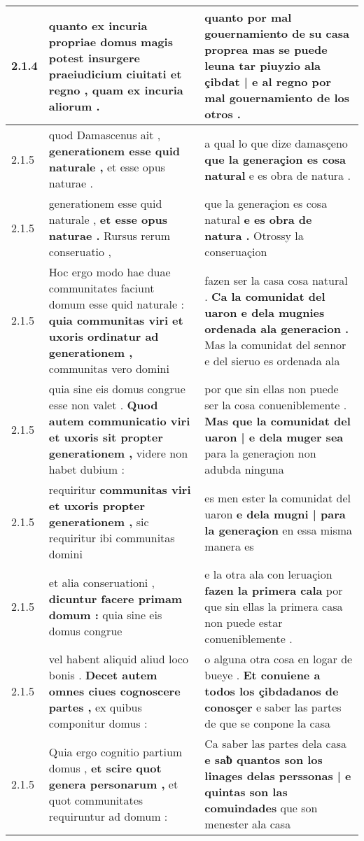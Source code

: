 \begin{tabular}{|p{1cm}|p{6.5cm}|p{6.5cm}|}
2.1.4 & quanto ex incuria propriae domus magis potest \textbf{ insurgere praeiudicium ciuitati et regno , } quam ex incuria aliorum . & quanto por mal gouernamiento de su casa proprea \textbf{ mas se puede leuna tar piuyzio ala çibdat | e al regno } por mal gouernamiento de los otros . \\\hline
2.1.5 & quod Damascenus ait , \textbf{ generationem esse quid naturale , } et esse opus naturae . & a qual lo que dize damasçeno \textbf{ que la generaçion es cosa natural } e es obra de natura . \\\hline
2.1.5 & generationem esse quid naturale , \textbf{ et esse opus naturae . } Rursus rerum conseruatio , & que la generaçion es cosa natural \textbf{ e es obra de natura . } Otrossy la conseruaçion \\\hline
2.1.5 & Hoc ergo modo hae duae communitates faciunt domum esse quid naturale : \textbf{ quia communitas viri et uxoris ordinatur ad generationem , } communitas vero domini & fazen ser la casa cosa natural . \textbf{ Ca la comunidat del uaron e dela mugnies ordenada ala generacion . } Mas la comunidat del sennor e del sieruo es ordenada ala \\\hline
2.1.5 & quia sine eis domus congrue esse non valet . \textbf{ Quod autem communicatio viri et uxoris sit propter generationem , } videre non habet dubium : & por que sin ellas non puede ser la cosa conueniblemente . \textbf{ Mas que la comunidat del uaron | e dela muger sea } para la generaçion non adubda ninguna \\\hline
2.1.5 & requiritur \textbf{ communitas viri et uxoris propter generationem , } sic requiritur ibi communitas domini & es men ester la comunidat del uaron \textbf{ e dela mugni | para la generaçion } en essa misma manera es \\\hline
2.1.5 & et alia conseruationi , \textbf{ dicuntur facere primam domum : } quia sine eis domus congrue & e la otra ala con leruaçion \textbf{ fazen la primera cala } por que sin ellas la primera casa non puede estar conueniblemente . \\\hline
2.1.5 & vel habent aliquid aliud loco bonis . \textbf{ Decet autem omnes ciues cognoscere partes , } ex quibus componitur domus : & o alguna otra cosa en logar de bueye . \textbf{ Et conuiene a todos los çibdadanos de conosçer } e saber las partes de que se conpone la casa \\\hline
2.1.5 & Quia ergo cognitio partium domus , \textbf{ et scire quot genera personarum , } et quot communitates requiruntur ad domum : & Ca saber las partes dela casa \textbf{ e saƀ quantos son los linages delas perssonas | e quintas son las comuindades } que son menester ala casa \\\hline

\end{tabular}

